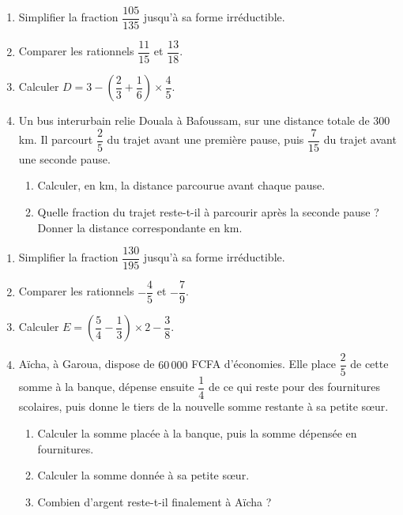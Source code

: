 \begin{enumerate}[label=\arabic*)]
\item Simplifier la fraction $\dfrac{105}{135}$ jusqu'à sa forme irréductible.
\item Comparer les rationnels $\dfrac{11}{15}$ et $\dfrac{13}{18}$.
\item Calculer $D=3-\left(\dfrac23+\dfrac16\right)\times\dfrac45$.
\item Un bus interurbain relie Douala à Bafoussam, sur une distance totale de $300$ km. Il
parcourt $\dfrac25$ du trajet avant une première pause, puis $\dfrac7{15}$ du trajet avant une
seconde pause.
\begin{enumerate}[label=\alph*)]
\item Calculer, en km, la distance parcourue avant chaque pause.
\item Quelle fraction du trajet reste-t-il à parcourir après la seconde pause ? Donner la
distance correspondante en km.
\end{enumerate}
\end{enumerate}

\begin{enumerate}[label=\arabic*)]
\item Simplifier la fraction $\dfrac{130}{195}$ jusqu'à sa forme irréductible.
\item Comparer les rationnels $-\dfrac45$ et $-\dfrac79$.
\item Calculer $E=\left(\dfrac54-\dfrac13\right)\times2-\dfrac38$.
\item Aïcha, à Garoua, dispose de $60\,000$ FCFA d'économies. Elle place $\dfrac25$ de cette
somme à la banque, dépense ensuite $\dfrac14$ de ce qui reste pour des fournitures scolaires,
puis donne le tiers de la nouvelle somme restante à sa petite sœur.
\begin{enumerate}[label=\alph*)]
\item Calculer la somme placée à la banque, puis la somme dépensée en fournitures.
\item Calculer la somme donnée à sa petite sœur.
\item Combien d'argent reste-t-il finalement à Aïcha ?
\end{enumerate}
\end{enumerate}

